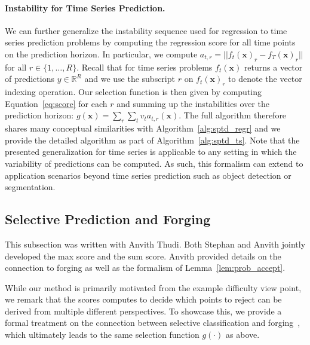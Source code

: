\paragraph{Instability for Time Series Prediction.} We can further generalize the instability sequence used for regression to time series prediction problems by computing the regression score for all time points on the prediction horizon. In particular, we compute $a_{t,r} = ||f_{t}(\bm{x})_r - f_{T}(\bm{x})_r||$ for all $r \in \{1,\ldots,R\}$. Recall that for time series problems $f_{t}(\bm{x})$ returns a vector of predictions $y \in \mathbb{R}^R$ and we use the subscript $r$ on $f_{t}(\bm{x})_r$ to denote the vector indexing operation. Our selection function is then given by computing Equation~\ref{eq:score} for each $r$ and summing up the instabilities over the prediction horizon: $g(\bm{x}) = \sum_r\sum_{t} v_t a_{t,r}(\bm{x})$. The full algorithm therefore shares many conceptual similarities with Algorithm~\ref{alg:sptd_regr} and we provide the detailed algorithm as part of Algorithm~\ref{alg:sptd_ts}. Note that the presented generalization for time series is applicable to any setting in which the variability of predictions can be computed. As such, this formalism can extend to application scenarios beyond time series prediction such as object detection or segmentation.

\subsection{Selective Prediction and Forging}
\label{sec:forging}

\begin{contriback}
This subsection was written with Anvith Thudi. Both Stephan and Anvith jointly developed the max score and the sum score. Anvith provided details on the connection to forging as well as the formalism of Lemma~\ref{lem:prob_accept}.
\end{contriback}

While our \sptd method is primarily motivated from the example difficulty view point, we remark that the scores \sptd computes to decide which points to reject can be derived from multiple different perspectives. To showcase this, we provide a formal treatment on the connection between selective classification and forging~\citep{thudi2022necessity}, which ultimately leads to the same selection function $g(\cdot)$ as above.

